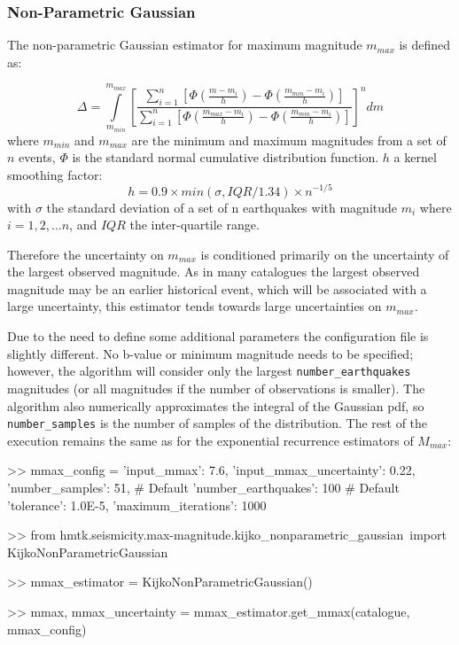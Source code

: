 \subsubsection{Non-Parametric Gaussian}

The non-parametric Gaussian estimator for maximum magnitude $m_{max}$ is defined as:

\begin{equation}
\Delta = \int\limits_{m_{min}}^{m_{max}} \left[ {\frac{\sum_{i = 1}^{n} \left[ {\Phi \left( {\frac{m - m_i}{h}} \right) - \Phi \left( {\frac{m_{min} - m_i}{h}} \right)} \right]}{\sum_{i = 1}^{n} \left[ {\Phi \left( {\frac{m_{max} - m_i}{h}} \right) - \Phi \left( {\frac{m_{min} - m_i}{h}} \right)} \right]}} \right]^n  dm
\end{equation}
where $m_{min}$ and $m_{max}$ are the minimum and maximum magnitudes from a set of $n$ events, $\Phi$ is the standard normal cumulative distribution function. $h$ a kernel smoothing factor:
\begin{equation}
h = 0.9 \times min\left( {\sigma, IQR / 1.34} \right) \times n^{-1 / 5}
\end{equation}
with $\sigma$ the standard deviation of a set of n earthquakes with magnitude $m_{i}$ where $i = 1, 2, ... n$, and $IQR$ the inter-quartile range. 

Therefore the uncertainty on $m_{max}$ is conditioned primarily on the uncertainty of the largest observed magnitude. As in many catalogues the largest observed magnitude may be an earlier historical event, which will be associated with a large uncertainty, this estimator tends towards large uncertainties on $m_{max}$.

Due to the need to define some additional parameters the configuration file is slightly different. No b-value or minimum magnitude needs to be specified; however, the algorithm will consider only the largest \verb=number_earthquakes= magnitudes (or all magnitudes if the number of observations is smaller). The algorithm also numerically approximates the integral of the Gaussian pdf, so \verb=number_samples= is the number of samples of the distribution. The rest of the execution remains the same as for the exponential recurrence estimators of $M_{max}$:

\begin{python}[frame=single]
>> mmax_config = {'input_mmax': 7.6,
                  'input_mmax_uncertainty': 0.22,
                  'number_samples': 51, # Default
                  'number_earthquakes': 100 # Default 
                  'tolerance': 1.0E-5, 
                  'maximum_iterations': 1000}
                       
>> from hmtk.seismicity.max-magnitude.kijko_nonparametric_gaussian\
     import KijkoNonParametricGaussian

>> mmax_estimator = KijkoNonParametricGaussian()

>> mmax, mmax_uncertainty = mmax_estimator.get_mmax(catalogue,
                                                    mmax_config)
                
\end{python}


